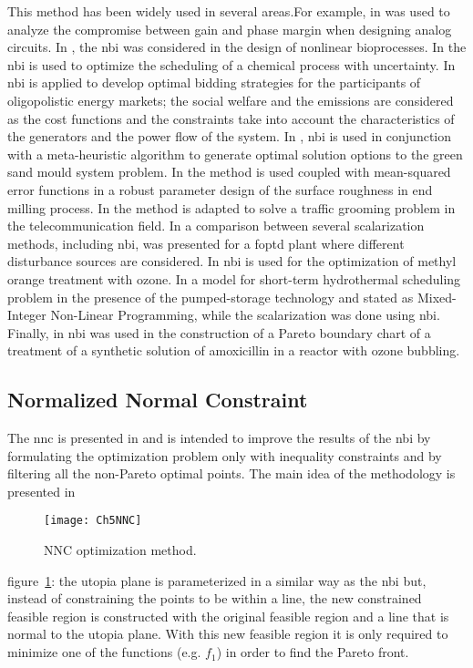 This method has been widely used in several areas.For example, in \citet{Stehr2003} was used to analyze the compromise between gain and phase margin when designing analog circuits. In \citet{Sendin2004}, the \gls{nbi} was considered in the design of nonlinear bioprocesses. In \citet{Ierapetritou2007a} the \gls{nbi} is used to optimize the scheduling of a chemical process with uncertainty. In \citet{Vahidinasab2010} \gls{nbi} is applied to develop optimal bidding strategies for the participants of oligopolistic energy markets; the social welfare and the emissions are considered as the cost functions and the constraints take into account the characteristics of the generators and the power flow of the system. In \citet{Ganesan2013}, \gls{nbi} is used in conjunction with a meta-heuristic algorithm to generate optimal solution options to the green sand mould system problem. In \citet{Brito2014} the method is used coupled with mean-squared error functions in a robust parameter design of the surface roughness in end milling process. In \citet{Rubio-Largo2014} the method is adapted to solve a traffic grooming problem in the telecommunication field. In \citet{Rojas2015b} a comparison between several scalarization methods, including \gls{nbi}, was presented for a \gls{foptd} plant where different disturbance sources are considered. In \citet{Naves2017} \gls{nbi} is used for the optimization of methyl orange treatment with ozone. In \citet{Simab2018} a model for short-term hydrothermal scheduling problem in the presence of the pumped-storage technology and stated as Mixed-Integer Non-Linear Programming, while the scalarization was done using \gls{nbi}. Finally, in \citet{Moura2018} \gls{nbi} was used in the construction of a Pareto boundary chart of a treatment of a synthetic solution of amoxicillin in a reactor with ozone bubbling.
\subsection{Normalized Normal Constraint}
\label{sec:NNC}
The \gls{nnc} is presented in \citet{Messac2003} and is intended to improve the results of the \gls{nbi} by formulating the optimization problem only with inequality constraints and by filtering all the non-Pareto optimal points. The main idea of the methodology is presented in
%
\begin{figure}[b]%
	\centering
	\texttt{[image: Ch5NNC]}%
	\caption{NNC optimization method.}%
	\label{fig:NNC}%
\end{figure}
%
figure~\ref{fig:NNC}: the utopia plane is parameterized in a similar way as the \gls{nbi} but, instead of constraining the points to be within a line, the new constrained feasible region is constructed with the original feasible region and a line that is normal to the utopia plane. With this new feasible region it is only required to minimize one of the functions (e.g. $f_{1}$) in order to find the Pareto front.

